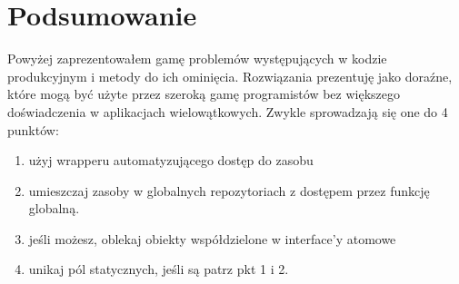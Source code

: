 \section{Podsumowanie}
Powyżej zaprezentowałem gamę problemów występujących w kodzie produkcyjnym i metody do ich ominięcia. Rozwiązania prezentuję jako doraźne, które mogą być użyte przez szeroką gamę programistów bez większego doświadczenia w aplikacjach wielowątkowych. Zwykle sprowadzają się one do 4 punktów:
\begin{enumerate}
\item użyj wrapperu  automatyzującego dostęp do zasobu
\item umieszczaj zasoby w globalnych repozytoriach z dostępem przez funkcję globalną.
\item jeśli możesz, oblekaj obiekty współdzielone w interface'y atomowe
\item unikaj pól statycznych, jeśli są patrz pkt 1 i 2.
\end{enumerate}

